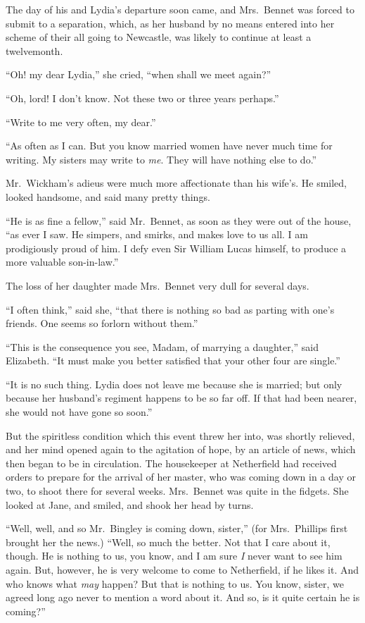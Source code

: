 The day of his and Lydia’s departure soon came, and
Mrs.\ Bennet was forced to submit to a separation, which,
as her husband by no means entered into her scheme of
their all going to Newcastle, was likely to continue at
least a twelvemonth.

“Oh! my dear Lydia,” she cried, “when shall we meet
again?”

“Oh, lord! I don’t know. Not these two or three
years perhaps.”

“Write to me very often, my dear.”

“As often as I can. But you know married women
have never much time for writing. My sisters may write
to \textit{me}. They will have nothing else to do.”

Mr.\ Wickham’s adieus were much more affectionate than
his wife’s. He smiled, looked handsome, and said many
pretty things.

“He is as fine a fellow,” said Mr.\ Bennet, as soon as
they were out of the house, “as ever I saw. He simpers,
and smirks, and makes love to us all. I am prodigiously
proud of him. I defy even Sir William Lucas himself,
to produce a more valuable son-in-law.”

The loss of her daughter made Mrs.\ Bennet very dull
for several days.

“I often think,” said she, “that there is nothing so
bad as parting with one’s friends. One seems so forlorn
without them.”

“This is the consequence you see, Madam, of marrying
a daughter,” said Elizabeth. “It must make you better
satisfied that your other four are single.”

“It is no such thing. Lydia does not leave me because
she is married; but only because her husband’s regiment
happens to be so far off. If that had been nearer, she
would not have gone so soon.”

But the spiritless condition which this event threw her
into, was shortly relieved, and her mind opened again to
the agitation of hope, by an article of news, which then
began to be in circulation. The housekeeper at Netherfield
had received orders to prepare for the arrival of her
master, who was coming down in a day or two, to shoot
there for several weeks. Mrs.\ Bennet was quite in the
fidgets. She looked at Jane, and smiled, and shook her
head by turns.

“Well, well, and so Mr.\ Bingley is coming down, sister,”
(for Mrs.\ Phillips first brought her the news.) “Well, so
much the better. Not that I care about it, though. He
is nothing to us, you know, and I am sure \textit{I} never want
to see him again. But, however, he is very welcome to
come to Netherfield, if he likes it. And who knows what
\textit{may} happen? But that is nothing to us. You know,
sister, we agreed long ago never to mention a word about
it. And so, is it quite certain he is coming?”

